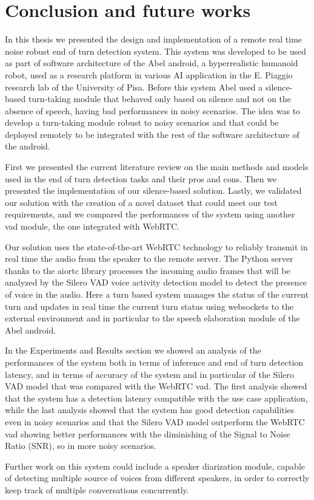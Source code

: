 \documentclass[../main.tex]{subfiles}
\begin{document}
\section{Conclusion and future works}

In this thesis we presented the design and implementation of a remote real time noise robust end of turn detection system. This system was developed to be used as part of software architecture of the Abel android, a hyperrealistic humanoid robot, used as a research platform in various AI application in the E. Piaggio research lab of the University of Pisa. Before this system Abel used a silence-based turn-taking module that behaved only based on silence and not on the absence of speech, having bad performances in noisy scenarios. The idea was to develop a turn-taking module robust to noisy scenarios and that could be deployed remotely to be integrated with the rest of the software architecture of the android.

First we presented the current literature review on the main methods and models used in the end of turn detection tasks and their pros and cons. Then we presented the implementation of our silence-based solution. Lastly, we validated our solution with the creation of a novel dataset that could meet our test requirements, and we compared the performances of the system using another vad module, the one integrated with WebRTC.

Our solution uses the state-of-the-art WebRTC technology to reliably transmit in real time the audio from the speaker to the remote server. The Python server thanks to the aiortc library processes the incoming audio frames that will be analyzed by the Silero VAD voice activity detection model to detect the presence of voice in the audio. Here a turn based system manages the status of the current turn and updates in real time the current turn status using websockets to the external environment and in particular to the speech elaboration module of the Abel android.

In the Experiments and Results section we showed an analysis of the performances of the system both in terms of inference and end of turn detection latency, and in terms of accuracy of the system and in particular of the Silero VAD model that was compared with the WebRTC vad. The first analysis showed that the system has a detection latency compatible with the use case application, while the last analysis showed that the system has good detection capabilities even in noisy scenarios and that the Silero VAD model outperform the WebRTC vad showing better performances with the diminishing of the Signal to Noise Ratio (SNR), so in more noisy scenarios.

Further work on this system could include a speaker diarization module, capable of detecting multiple source of voices from different speakers, in order to correctly keep track of multiple conversations concurrently. 
\end{document}
